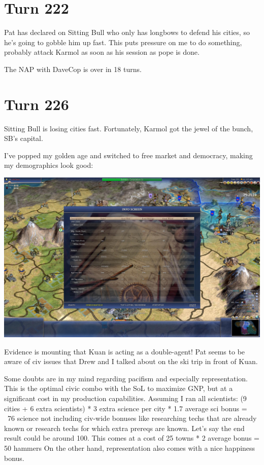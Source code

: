 \documentclass[10pt]{article}
\begin{document}
\section*{Turn 222}

Pat has declared on Sitting Bull who only has longbows to defend his
cities, so he's going to gobble him up fast. This puts pressure on me
to do something, probably attack Karmol as soon as his session as pope
is done.

The NAP with DaveCop is over in 18 turns.

\section*{Turn 226}

Sitting Bull is losing cities fast. Fortunately, Karmol got the jewel of the bunch, SB's capital.

I've popped my golden age and switched to free market and democracy, making my demographics look good:

\includegraphics[width=1.0\textwidth]{turn225}

Evidence is mounting that Kuan is acting as a double-agent! Pat seems
to be aware of civ issues that Drew and I talked about on the ski trip
in front of Kuan.

Some doubts are in my mind regarding pacifism and especially representation. This is the optimal civic combo with the SoL to maximize GNP, but at a significant cost in my production capabilities. Assuming I ran all scientists:
(9 cities + 6 extra scientists) * 3 extra science per city * 1.7 average sci bonus = ~76 science not including civ-wide bonuses like researching techs that are already known or research techs for which extra prereqs are known. Let's say the end result could be around 100. This comes at a cost of
25 towns * 2 average bonus = 50 hammers
On the other hand, representation also comes with a nice happiness bonus.
\end{document}
